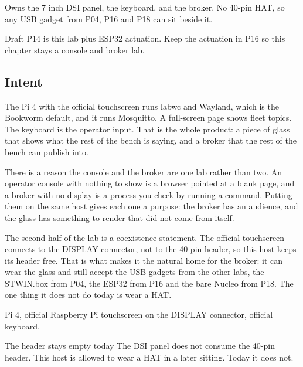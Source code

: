 
\begin{unique}
Owns the 7 inch DSI panel, the keyboard, and the broker. No 40-pin HAT, so any USB gadget from P04, P16 and P18 can sit beside it.
\end{unique}

\begin{blueprint}
Draft P14 is this lab plus ESP32 actuation. Keep the actuation in P16 so this chapter stays a console and broker lab.
\end{blueprint}

\subsection*{Intent}

The Pi 4 with the official touchscreen runs labwc and Wayland, which is the Bookworm default, and it runs Mosquitto. A full-screen page shows fleet topics. The keyboard is the operator input. That is the whole product: a piece of glass that shows what the rest of the bench is saying, and a broker that the rest of the bench can publish into.

There is a reason the console and the broker are one lab rather than two. An operator console with nothing to show is a browser pointed at a blank page, and a broker with no display is a process you check by running a command. Putting them on the same host gives each one a purpose: the broker has an audience, and the glass has something to render that did not come from itself.

The second half of the lab is a coexistence statement. The official touchscreen connects to the DISPLAY connector, not to the 40-pin header, so this host keeps its header free. That is what makes it the natural home for the broker: it can wear the glass and still accept the USB gadgets from the other labs, the STWIN.box from P04, the ESP32 from P16 and the bare Nucleo from P18. The one thing it does not do today is wear a HAT.

\begin{kit}
Pi 4, official Raspberry Pi touchscreen on the DISPLAY connector, official keyboard.
\end{kit}

\begin{rulebox}{The header stays empty today}
The DSI panel does not consume the 40-pin header. This host is allowed to wear a HAT in a later sitting. Today it does not.
\end{rulebox}

